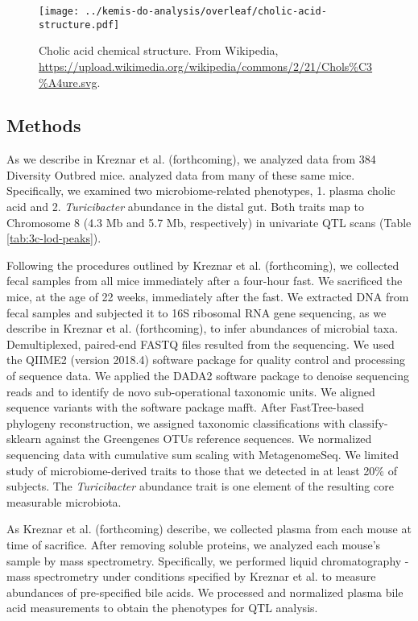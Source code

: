 \documentclass[oneside]{book}
\begin{document}
\begin{figure}
\centering
\texttt{[image: ../kemis-do-analysis/overleaf/cholic-acid-structure.pdf]}
\caption[Cholic acid chemical structure.]{Cholic acid chemical structure. From Wikipedia, \url{https://upload.wikimedia.org/wikipedia/commons/2/21/Chols\%C3\%A4ure.svg}.}\label{fig:cholic-structure}
\end{figure}



\subsection{Methods}

As we describe in Kreznar et al. (forthcoming), we analyzed data from 384 Diversity Outbred mice. \citet{keller2018genetic} analyzed data from many of these same mice. Specifically, we examined two microbiome-related phenotypes, 1. plasma cholic acid and 2. \emph{Turicibacter} abundance in the distal gut. Both traits map to Chromosome 8 (4.3 Mb and 5.7 Mb, respectively) in univariate QTL scans (Table \ref{tab:3c-lod-peaks}).

Following the procedures outlined by Kreznar et al. (forthcoming), 
we collected fecal samples from all mice immediately 
after a four-hour fast. We sacrificed the mice, at the age of 22 
weeks, immediately after the fast. We extracted DNA from fecal 
samples and subjected it to 16S ribosomal RNA gene sequencing, as we 
describe in Kreznar et al. (forthcoming), to infer 
abundances of microbial taxa. Demultiplexed, 
paired-end FASTQ files resulted from the sequencing. We used the 
QIIME2 (version 2018.4) software package for quality control and 
processing of sequence data. We applied the DADA2 software package 
to denoise sequencing reads and to identify de novo sub-operational 
taxonomic units. We aligned sequence variants with the software 
package mafft. After FastTree-based phylogeny reconstruction, we 
assigned taxonomic classifications with classify-sklearn against the 
Greengenes OTUs reference sequences. We normalized sequencing data 
with cumulative sum scaling with MetagenomeSeq. We limited study of 
microbiome-derived traits to those that we detected in at least 20\% 
of subjects. The \emph{Turicibacter} abundance trait is one element 
of the resulting core measurable microbiota. 


As Kreznar et al. (forthcoming) describe, we collected
plasma from each mouse at time of sacrifice. After removing soluble 
proteins, we analyzed each mouse's sample by mass spectrometry. 
Specifically, we performed liquid chromatography - mass spectrometry 
under conditions specified by Kreznar et al. to measure abundances 
of pre-specified bile acids. We processed and normalized plasma bile 
acid measurements to obtain the phenotypes for QTL analysis.
\end{document}
